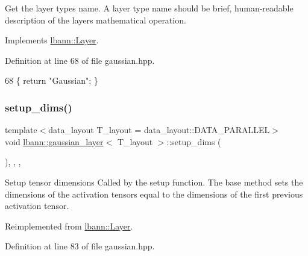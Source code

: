 Get the layer type\textquotesingle{}s name. A layer type name should be brief, human-\/readable description of the layer\textquotesingle{}s mathematical operation. 

Implements \hyperlink{classlbann_1_1Layer_a0fa0ea9160b490c151c0a17fde4f7239}{lbann\+::\+Layer}.



Definition at line 68 of file gaussian.\+hpp.


\begin{DoxyCode}
68 \{ \textcolor{keywordflow}{return} \textcolor{stringliteral}{"Gaussian"}; \}
\end{DoxyCode}
\mbox{\label{classlbann_1_1gaussian__layer_ab48263a742e407a8d3586ee4ece38768}} 
\subsubsection{\texorpdfstring{setup\+\_\+dims()}{setup\_dims()}}
{\footnotesize\ttfamily template$<$data\+\_\+layout T\+\_\+layout = data\+\_\+layout\+::\+D\+A\+T\+A\+\_\+\+P\+A\+R\+A\+L\+L\+EL$>$ \\
void \hyperlink{classlbann_1_1gaussian__layer}{lbann\+::gaussian\+\_\+layer}$<$ T\+\_\+layout $>$\+::setup\+\_\+dims (\begin{DoxyParamCaption}{ }\end{DoxyParamCaption})\hspace{0.3cm}{\ttfamily [inline]}, {\ttfamily [override]}, {\ttfamily [protected]}, {\ttfamily [virtual]}}

Setup tensor dimensions Called by the setup function. The base method sets the dimensions of the activation tensors equal to the dimensions of the first previous activation tensor. 

Reimplemented from \hyperlink{classlbann_1_1Layer_a90fce1b06c1f2abb480e18cfe08a9746}{lbann\+::\+Layer}.



Definition at line 83 of file gaussian.\+hpp.


